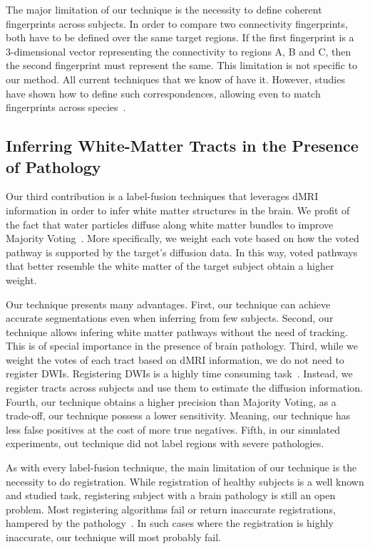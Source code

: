 The major limitation of our technique is the necessity to define coherent
fingerprints across subjects. In order to compare two connectivity fingerprints,
both have to be defined over the same target regions. If the first fingerprint
is a 3-dimensional vector representing the connectivity to regions A, B and C,
then the second fingerprint must represent the same. This limitation is not
specific to our method. All current techniques that we know of have it. However,
studies have shown how to define such correspondences, allowing even to match
fingerprints across species~\cite{Mars2016, Mars2018}.

\subsection{Inferring White-Matter Tracts in the Presence of Pathology}
Our third contribution is a label-fusion techniques that leverages dMRI information
in order to infer white matter structures in the brain. We profit of the fact
that water particles diffuse along white matter bundles to improve Majority
Voting~\cite{Xu1992}. More specifically, we weight each vote based on how the voted pathway
is supported by the target's diffusion data. In this way, voted
pathways that better resemble the white matter of the target subject obtain a 
higher weight.

Our technique presents many advantages. First, our technique can achieve accurate
segmentations even when inferring from few subjects. Second, our technique
allows infering white matter pathways without the need of tracking. This is of
special importance in the presence of brain pathology. Third, while we weight the
votes of each tract based on dMRI information, we do not need to register
DWIs. Registering DWIs is a highly time consuming task~\cite{ODonnell2017}.
Instead, we register tracts across subjects and use them to estimate the diffusion
information. Fourth, our technique obtains a higher precision than Majority
Voting, as a trade-off, our technique possess a lower sensitivity. Meaning,
our technique has less false positives at the cost of more true negatives.
Fifth, in our simulated experiments, out technique did not label regions with
severe pathologies.

As with every label-fusion technique, the main limitation of our technique
is the necessity to do registration. While registration of healthy subjects
is a well known and studied task, registering subject with a brain pathology
is still an open problem. Most registering algorithms fail or return inaccurate
registrations, hampered by the pathology~\cite{Lutkenhoff2014}. In such cases
where the registration is highly inaccurate, our technique will most probably fail.

